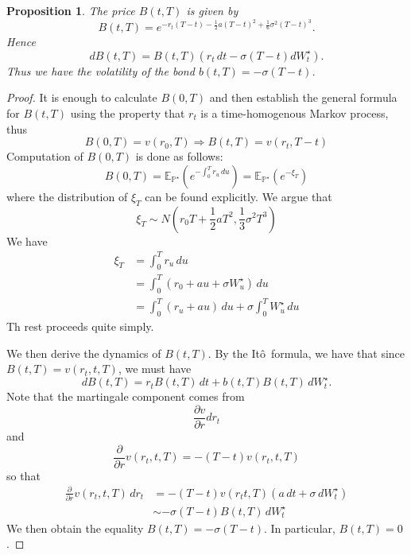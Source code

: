 \documentclass[10pt, oneside, reqno]{amsbook}
\theoremstyle{plain}%
\newtheorem{prop}[thm]{Proposition}
\theoremstyle{definition}
\theoremstyle{rem}
\theoremstyle{definition}
\def \P {\ensuremath{\mathcal{P}}}
\newcommand{\E}{\mathbb{E}}
\renewcommand{\P}{\mathbb{P}}
\newcommand{\ito}{It\^o\ }
\numberwithin{equation}{chapter}
\begin{document}
    \begin{prop}
        The price $B(t, T)$ is given by \begin{equation}
            \label{eq:merton_short_rate_price}
            B(t, T) = e^{-r_t(T-t) - \frac{1}{2}a(T-t)^2 + \frac{1}{6} \sigma^2(T-t)^3}.  
        \end{equation}  Hence \[
            dB(t, T) = B(t, T)\left(r_t \, dt - \sigma(T-t) dW^\star_t \right).
        \]  Thus we have the volatility of the bond $b(t, T) = -\sigma(T-t)$.
    \end{prop}
    
    \begin{proof}
        It is enough to calculate $B(0, T)$ and then establish the general formula for $B(t, T)$ using the property that $r_t$ is a time-homogenous Markov process, thus \[
            B(0, T) = v(r_0, T) \Rightarrow B(t, T) =v(r_t, T-t)
        \]
        Computation of $B(0, T)$ is done as follows:\[
            B(0, T) = \E_{\P^\star} \left(e^{-\int_0^T r_u \, du} \right) = \E_{\P^\star} \left( e^{-\xi_T} \right)
        \] where the distribution of $\xi_T$ can be found explicitly.  We argue that \[
            \xi_T \sim N\left(r_0 T + \frac{1}{2} a T^2, \frac{1}{3} \sigma^2 T^3 \right)
        \]  We have \begin{align*}
            \xi_T   &= \int_0^T r_u \, du \\
                    &= \int_0^T \left( r_0 + au + \sigma W^\star_u \right) \, du \\
                    &= \int_0^T (r_u + au)  \, du + \sigma \int_0^T W^\star_u \, du
        \end{align*}
        Th rest proceeds quite simply.
        
        We then derive the dynamics of $B(t, T)$.  By the \ito formula, we have that since $B(t, T) = v(r_t, t, T)$, we must have \[
            dB(t, T) = r_t B(t, T) \, dt + b(t, T) B(t, T) \, dW^\star_t.  
        \] Note that the martingale component comes from \[
            \frac{\partial v}{\partial r} dr_t 
        \] and \[
            \frac{\partial}{\partial r}v(r_t, t, T) = -(T- t) v(r_t, t, T)
        \] so that \begin{align*}
            \frac{\partial}{\partial r}v(r_t, t, T) \, dr_t &= -(T-t) v(r_t t, T) (a \, dt + \sigma \, dW^\star_t) \\
            &\sim - \sigma(T- t)B(t, T) \, dW^\star_t
        \end{align*}  We then obtain the equality $B(t, T) = -\sigma(T-t)$.  In particular, $B(t, T) = 0$.  
    \end{proof}
    
\end{document}
